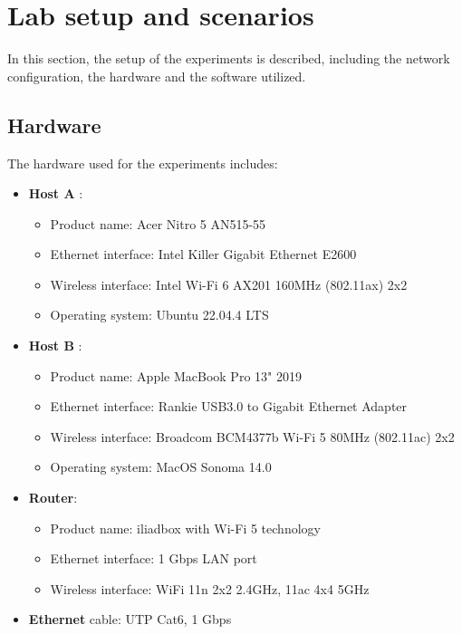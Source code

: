 \section{Lab setup and scenarios}
\label{sec:lab_setup_and_scenarios}
In this section, the setup of the experiments is described, including the network configuration, the hardware and the software utilized.

\subsection{Hardware}
The hardware used for the experiments includes:

\begin{itemize}
    \item \textbf{Host A} \label{sec:host-a}:
        \begin{itemize}
            \item Product name: Acer Nitro 5 AN515-55
            \item Ethernet interface: Intel{\textregistered} Killer{\texttrademark} Gigabit Ethernet E2600
            \item Wireless interface: Intel{\textregistered} Wi-Fi 6 AX201 160MHz (802.11ax) 2x2
            \item Operating system: Ubuntu 22.04.4 LTS
        \end{itemize}
    \item \textbf{Host B} \label{sec:host-b}:    
     \begin{itemize}
            \item Product name: Apple MacBook Pro 13" 2019 
            \item Ethernet interface: Rankie USB3.0 to Gigabit Ethernet Adapter
            \item Wireless interface: Broadcom BCM4377b Wi-Fi 5 80MHz (802.11ac) 2x2
            \item Operating system: MacOS Sonoma 14.0
        \end{itemize}
    \item  \textbf{Router}: 
        \begin{itemize}
            \item Product name: iliadbox with Wi-Fi 5 technology
            \item Ethernet interface: 1 Gbps LAN port
            \item Wireless interface: WiFi 11n 2x2 2.4GHz, 11ac 4x4 5GHz
        \end{itemize}
    \item \textbf{Ethernet} cable: UTP Cat6, 1 Gbps
\end{itemize}

